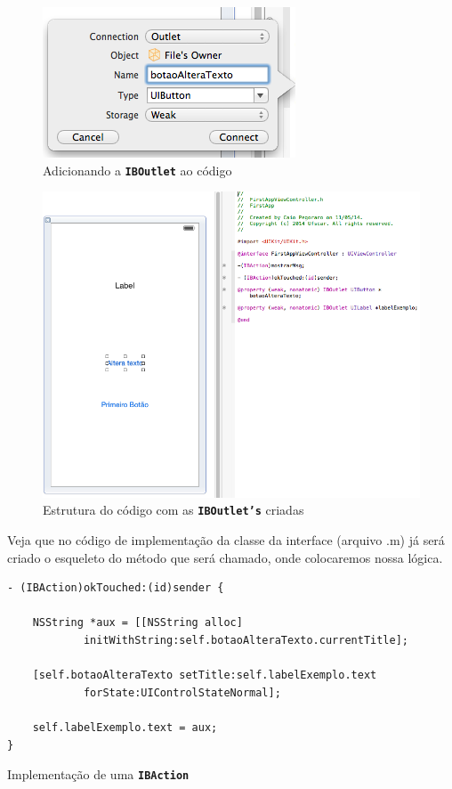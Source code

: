 \documentclass[a4paper,12pt,brazil,oneside]{book}
\begin{document}
\begin{figure}[H]
  \centering
  \includegraphics[width=.45\textwidth]{figuras/3/tela_novo_projeto_29.png}
  \caption{Adicionando a \texttt{\textbf{IBOutlet}} ao código}
  \label{fig:a}
\end{figure}

\begin{figure}[H]
  \centering
  \includegraphics[width=.75\textwidth]{figuras/3/tela_novo_projeto_30.png}
  \caption{Estrutura do código com as \texttt{\textbf{IBOutlet's}} criadas}
  \label{fig:a}
\end{figure}


Veja que no código de implementação da classe da interface (arquivo .m) já será criado o esqueleto do método que será chamado, onde colocaremos nossa lógica.

\begin{listing}[H]
\begin{verbatim}
- (IBAction)okTouched:(id)sender {
    
    NSString *aux = [[NSString alloc] 
    		initWithString:self.botaoAlteraTexto.currentTitle];
    
    [self.botaoAlteraTexto setTitle:self.labelExemplo.text 
    		forState:UIControlStateNormal];
    
    self.labelExemplo.text = aux;
}
\end{verbatim}
\caption{Implementação de uma \texttt{\textbf{IBAction}}}
\end{listing}
\end{document}
